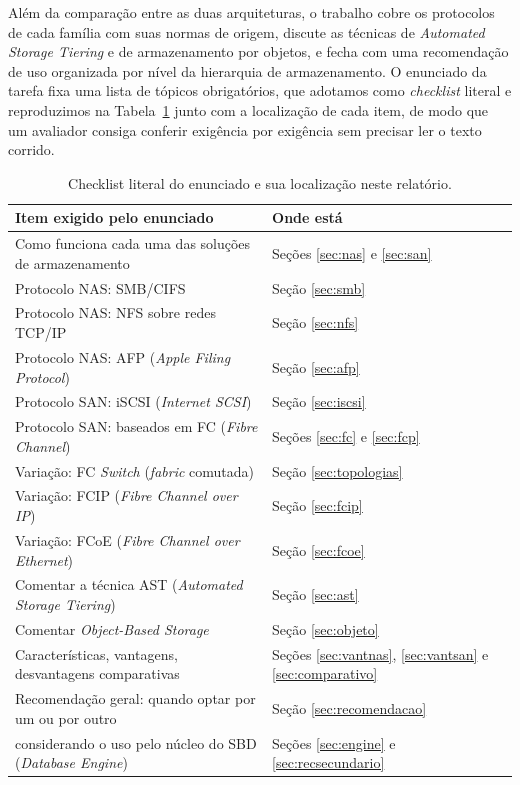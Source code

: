 \documentclass[11pt,a4paper]{article}
\begin{document}
Além da comparação entre as duas arquiteturas, o trabalho cobre os protocolos de cada família com
suas normas de origem, discute as técnicas de \textit{Automated Storage Tiering} e de armazenamento
por objetos, e fecha com uma recomendação de uso organizada por nível da hierarquia de
armazenamento. O enunciado da tarefa fixa uma lista de tópicos obrigatórios, que adotamos como
\textit{checklist} literal e reproduzimos na Tabela~\ref{tab:checklist} junto com a localização de
cada item, de modo que um avaliador consiga conferir exigência por exigência sem precisar ler o
texto corrido.

\begin{table}[H]
\centering
\caption{Checklist literal do enunciado e sua localização neste relatório.}
\label{tab:checklist}
{\footnotesize
\begin{tabular}{@{}p{10.6cm}l@{}}
\toprule
\textbf{Item exigido pelo enunciado} & \textbf{Onde está} \\
\midrule
Como funciona cada uma das soluções de armazenamento & Seções \ref{sec:nas} e \ref{sec:san} \\
Protocolo NAS: SMB/CIFS & Seção \ref{sec:smb} \\
Protocolo NAS: NFS sobre redes TCP/IP & Seção \ref{sec:nfs} \\
Protocolo NAS: AFP (\textit{Apple Filing Protocol}) & Seção \ref{sec:afp} \\
Protocolo SAN: iSCSI (\textit{Internet SCSI}) & Seção \ref{sec:iscsi} \\
Protocolo SAN: baseados em FC (\textit{Fibre Channel}) & Seções \ref{sec:fc} e \ref{sec:fcp} \\
Variação: FC \textit{Switch} (\textit{fabric} comutada) & Seção \ref{sec:topologias} \\
Variação: FCIP (\textit{Fibre Channel over IP}) & Seção \ref{sec:fcip} \\
Variação: FCoE (\textit{Fibre Channel over Ethernet}) & Seção \ref{sec:fcoe} \\
Comentar a técnica AST (\textit{Automated Storage Tiering}) & Seção \ref{sec:ast} \\
Comentar \textit{Object-Based Storage} & Seção \ref{sec:objeto} \\
Características, vantagens, desvantagens comparativas & Seções \ref{sec:vantnas}, \ref{sec:vantsan} e \ref{sec:comparativo} \\
Recomendação geral: quando optar por um ou por outro & Seção \ref{sec:recomendacao} \\
\quad considerando o uso pelo núcleo do SBD (\textit{Database Engine}) & Seções \ref{sec:engine} e \ref{sec:recsecundario} \\

\end{tabular}}
\end{table}
\end{document}

